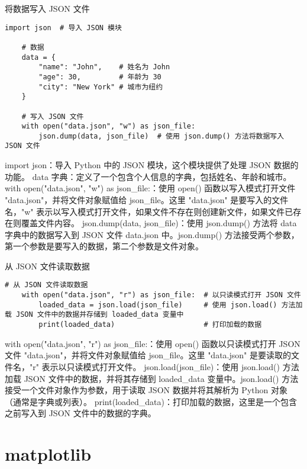 \documentclass{article}
\begin{document}
将数据写入 JSON 文件
\begin{lstlisting}[caption={示例Python代码}]
    import json  # 导入 JSON 模块

    # 数据
    data = {
        "name": "John",    # 姓名为 John
        "age": 30,         # 年龄为 30
        "city": "New York" # 城市为纽约
    }
    
    # 写入 JSON 文件
    with open("data.json", "w") as json_file:
        json.dump(data, json_file)  # 使用 json.dump() 方法将数据写入 JSON 文件
\end{lstlisting}
import json：导入 Python 中的 JSON 模块，这个模块提供了处理 JSON 数据的功能。
data 字典：定义了一个包含个人信息的字典，包括姓名、年龄和城市。
with open("data.json", "w") as json\_file:：使用 open() 函数以写入模式打开文件 "data.json"，并将文件对象赋值给 json\_file。这里 "data.json" 是要写入的文件名，"w" 表示以写入模式打开文件，如果文件不存在则创建新文件，如果文件已存在则覆盖文件内容。
json.dump(data, json\_file)：使用 json.dump() 方法将 data 字典中的数据写入到 JSON 文件 data.json 中。json.dump() 方法接受两个参数，第一个参数是要写入的数据，第二个参数是文件对象。

从 JSON 文件读取数据
\begin{lstlisting}[caption={示例Python代码}]
    # 从 JSON 文件读取数据
    with open("data.json", "r") as json_file:  # 以只读模式打开 JSON 文件
        loaded_data = json.load(json_file)     # 使用 json.load() 方法加载 JSON 文件中的数据并存储到 loaded_data 变量中
        print(loaded_data)                     # 打印加载的数据
    \end{lstlisting}

        with open("data.json", "r") as json\_file:：使用 open() 函数以只读模式打开 JSON 文件 "data.json"，并将文件对象赋值给 json\_file。这里 "data.json" 是要读取的文件名，"r" 表示以只读模式打开文件。
        json.load(json\_file)：使用 json.load() 方法加载 JSON 文件中的数据，并将其存储到 loaded\_data 变量中。json.load() 方法接受一个文件对象作为参数，用于读取 JSON 数据并将其解析为 Python 对象（通常是字典或列表）。
        print(loaded\_data)：打印加载的数据，这里是一个包含之前写入到 JSON 文件中的数据的字典。

\section{matplotlib}
\end{document}
